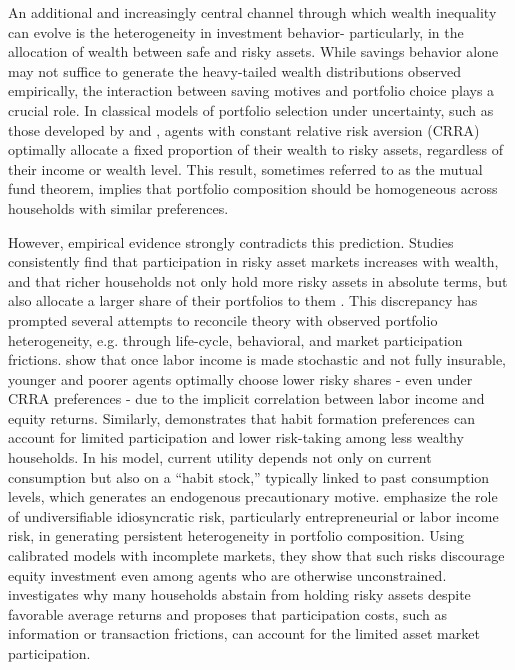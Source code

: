 \documentclass[12pt]{article}
\begin{document}
An additional and increasingly central channel through which wealth inequality can evolve is the heterogeneity in investment behavior- particularly, in the allocation of wealth between safe and risky assets. While savings behavior alone may not suffice to generate the heavy-tailed wealth distributions observed empirically, the interaction between saving motives and portfolio choice plays a crucial role. In classical models of portfolio selection under uncertainty, such as those developed by \textcite{samuelson1969} and \textcite{merton1969}, agents with constant relative risk aversion (CRRA) optimally allocate a fixed proportion of their wealth to risky assets, regardless of their income or wealth level. This result, sometimes referred to as the mutual fund theorem, implies that portfolio composition should be homogeneous across households with similar preferences.

However, empirical evidence strongly contradicts this prediction. Studies consistently find that participation in risky asset markets increases with wealth, and that richer households not only hold more risky assets in absolute terms, but also allocate a larger share of their portfolios to them \parencite{campbell2002,fagereng2020}. This discrepancy has prompted several attempts to reconcile theory with observed portfolio heterogeneity, e.g. through life-cycle, behavioral, and market participation frictions. \textcite{cocco2005} show that once labor income is made stochastic and not fully insurable, younger and poorer agents optimally choose lower risky shares - even under CRRA preferences - due to the implicit correlation between labor income and equity returns. Similarly, \textcite{constantinides1986} demonstrates that habit formation preferences can account for limited participation and lower risk-taking among less wealthy households. In his model, current utility depends not only on current consumption but also on a “habit stock,” typically linked to past consumption levels, which generates an endogenous precautionary motive. \textcite{heaton2000} emphasize the role of undiversifiable idiosyncratic risk, particularly entrepreneurial or labor income risk, in generating persistent heterogeneity in portfolio composition. Using calibrated models with incomplete markets, they show that such risks discourage equity investment even among agents who are otherwise unconstrained. \textcite{vissing2002} investigates why many households abstain from holding risky assets despite favorable average returns and proposes that participation costs, such as information or transaction frictions, can account for the limited asset market participation.
\end{document}
